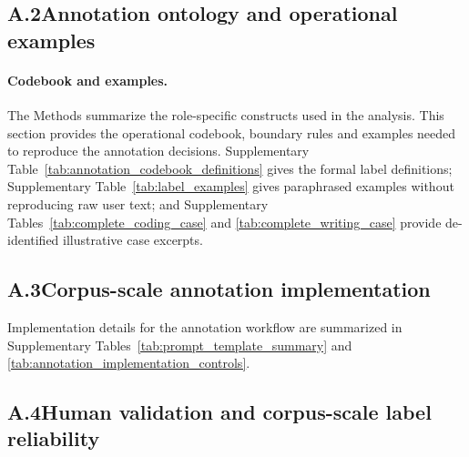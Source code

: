 




\clearpage

\subsection*{A.2\quad Annotation ontology and operational examples}
\label{supp:a2}

\paragraph{Codebook and examples.}
The Methods summarize the role-specific constructs used in the analysis. This section provides the operational codebook, boundary rules and examples needed to reproduce the annotation decisions. Supplementary Table~\ref{tab:annotation_codebook_definitions} gives the formal label definitions; Supplementary Table~\ref{tab:label_examples} gives paraphrased examples without reproducing raw user text; and Supplementary Tables~\ref{tab:complete_coding_case} and \ref{tab:complete_writing_case} provide de-identified illustrative case excerpts. 



\clearpage

\subsection*{A.3\quad Corpus-scale annotation implementation}
\label{supp:a3}

Implementation details for the annotation workflow are summarized in Supplementary Tables~\ref{tab:prompt_template_summary} and \ref{tab:annotation_implementation_controls}.





\clearpage

\subsection*{A.4\quad Human validation and corpus-scale label reliability}
\label{supp:a4}

